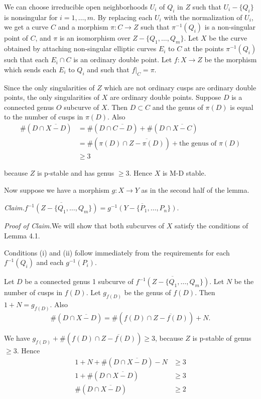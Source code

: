 \documentclass[12pt]{memoir}
\begin{document}
\begin{ptcbp}
We can choose irreducible open neighborhoods $U_i$ of $Q_i$ in $Z$ such that $U_i - \{Q_i\}$ is nonsingular for $i = 1, \dots, m$. By replacing each $U_i$ with the normalization of $U_i$, we get a curve $C$ and a morphism $\pi\colon C \to Z$ such that $\pi^{-1}(Q_i)$ is a non-singular point of $C$, and $\pi$ is an isomorphism over $Z - \{Q_1, \dots, Q_m\}$. Let $X$ be the curve obtained by attaching non-singular elliptic curves $E_i$ to $C$ at the points $\pi^{-1}(Q_i)$ such that each $E_i \cap C$ is an ordinary double point. Let $f\colon X \to Z$ be the morphism which sends each $E_i$ to $Q_i$ and such that $f|_C = \pi$.

Since the only singularities of $Z$ which are not ordinary cusps are ordinary double points, the only singularities of $X$ are ordinary double points. Suppose $D$ is a connected genus $O$ subcurve of $X$. Then $D \subset C$ and the genus of $\pi(D)$ is equal to the number of cusps in $\pi(D)$. Also
\begin{align*}
\#(D \cap \overline{X - D}) &= \#(D \cap \overline{C - D}) + \#(D \cap \overline{X - C}) \\
&= \#(\pi(D) \cap \overline{Z - \pi(D)}) + \text{the genus of } \pi(D) \\
&\geqslant 3
\end{align*}

because $Z$ is p-stable and has genus $\geqslant 3$. Hence $X$ is M-D stable.

Now suppose we have a morphism $g\colon X \to Y$ as in the second half of the lemma.

\emph{Claim.}\quad $\overline{f^{-1}(Z - \{Q_1, \dots, Q_m\})} = \overline{g^{-1}(Y - \{P_1, \dots, P_n\})}$.

\emph{Proof of Claim.}\quad We will show that both subcurves of $X$ satisfy the conditions of Lemma 4.1.


Conditions (i) and (ii) follow immediately from the requirements for each $f^{-1}(Q_i)$ and each $g^{-1}(P_i)$.

Let $D$ be a connected genus 1 subcurve of $\overline{f^{-1}(Z - \{Q_1, \dots, Q_m\})}$. Let $N$ be the number of cusps in $f(D)$. Let $g_{f(D)}$ be the genus of $f(D)$. Then $1 + N = g_{f(D)}$. Also
\[
\#(D \cap \overline{X - D}) = \#(f(D) \cap \overline{Z - f(D)}) + N.
\]

We have $g_{f(D)} + \#(f(D) \cap \overline{Z - f(D)}) \geqslant 3$, because $Z$ is p-stable of genus $\geqslant 3$. Hence
\begin{align*}
1 + N + \#(D \cap \overline{X - D}) - N &\geqslant 3 \\
1 + \#(D \cap \overline{X - D}) &\geqslant 3 \\
\#(D \cap \overline{X - D}) &\geqslant 2
\end{align*}


\end{ptcbp}
\end{document}
